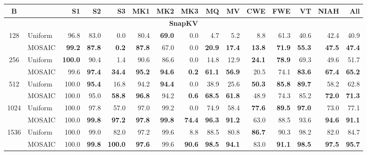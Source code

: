 \begin{table}[tp]
  \centering
  \scriptsize
  \setlength{\tabcolsep}{4pt}
  \renewcommand{\arraystretch}{0.92}
  \begin{tabular}{@{} c l rrrrrrrrrrrrr @{}}
    \toprule
    \textbf{B} & & \textbf{S1} & \textbf{S2} & \textbf{S3} & \textbf{MK1} & \textbf{MK2} & \textbf{MK3} & \textbf{MQ} & \textbf{MV} & \textbf{CWE} & \textbf{FWE} & \textbf{VT} & \textbf{NIAH} & \textbf{All} \\
    \midrule
    \multicolumn{15}{c}{\textbf{SnapKV}} \\
    \midrule
    \multirow{2}{*}{128} & Uniform & 96.8 & 83.0 & 0.0 & 80.4 & \textbf{69.0} & 0.0 & 4.7 & 5.2 & 8.8 & 61.3 & 40.6 & 42.4 & 40.9 \\
     & MOSAIC & \textbf{99.2} & \textbf{87.8} & \textbf{0.2} & \textbf{87.8} & 67.0 & 0.0 & \textbf{20.9} & \textbf{17.4} & \textbf{13.8} & \textbf{71.9} & \textbf{55.3} & \textbf{47.5} & \textbf{47.4} \\
    \cmidrule(l){1-15}
    \multirow{2}{*}{256} & Uniform & \textbf{100.0} & 90.4 & 1.4 & 90.6 & 86.6 & 0.0 & 14.8 & 12.9 & \textbf{24.1} & \textbf{78.9} & 69.3 & 49.6 & 51.7 \\
     & MOSAIC & 99.6 & \textbf{97.4} & \textbf{34.4} & \textbf{95.2} & \textbf{94.6} & \textbf{0.2} & \textbf{61.1} & \textbf{56.9} & 20.5 & 74.1 & \textbf{83.6} & \textbf{67.4} & \textbf{65.2} \\
    \cmidrule(l){1-15}
    \multirow{2}{*}{512} & Uniform & 100.0 & \textbf{95.4} & 16.8 & 94.2 & \textbf{94.4} & 0.0 & 38.9 & 25.6 & \textbf{50.3} & \textbf{85.8} & \textbf{89.7} & 58.2 & 62.8 \\
     & MOSAIC & 100.0 & 95.0 & \textbf{58.8} & \textbf{96.8} & 94.2 & \textbf{0.6} & \textbf{68.5} & \textbf{61.8} & 48.9 & 74.3 & 85.2 & \textbf{72.0} & \textbf{71.3} \\
    \cmidrule(l){1-15}
    \multirow{2}{*}{1024} & Uniform & 100.0 & 97.8 & 57.0 & 97.0 & 99.2 & 0.0 & 74.9 & 58.4 & \textbf{77.6} & \textbf{89.5} & \textbf{97.0} & 73.0 & 77.1 \\
     & MOSAIC & 100.0 & \textbf{99.8} & \textbf{97.2} & \textbf{97.8} & \textbf{99.8} & \textbf{74.4} & \textbf{96.3} & \textbf{91.2} & 63.0 & 88.5 & 93.6 & \textbf{94.6} & \textbf{91.1} \\
    \cmidrule(l){1-15}
    \multirow{2}{*}{1536} & Uniform & 100.0 & 99.0 & 82.0 & 97.2 & 99.6 & 8.8 & 88.5 & 80.8 & \textbf{86.7} & 90.3 & 98.2 & 82.0 & 84.7 \\
     & MOSAIC & 100.0 & \textbf{99.8} & \textbf{100.0} & \textbf{97.6} & 99.6 & \textbf{90.6} & \textbf{98.5} & \textbf{94.1} & 83.0 & \textbf{91.1} & \textbf{98.5} & \textbf{97.5} & \textbf{95.7} \\

\end{tabular}
\end{table}
